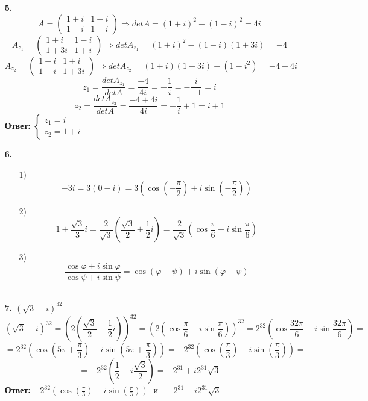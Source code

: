 \documentclass[a4paper]{article}
\newcommand{\mat}[1]{\begin{pmatrix} #1 \end{pmatrix}}
\renewcommand{\f}[2]{\frac{#1}{#2}}
\newcommand{\case}[1]{\begin{cases} #1 \end{cases}}
\renewcommand{\phi}{\varphi}
\renewcommand{\r}{\Rightarrow}
\begin{document}
\begin{enumerate}
    \item[\textbf{5.}]$$A = \mat{1+i & 1-i  \\ 1-i & 1+i} \r det A = (1+i)^2-(1-i)^2 = 4i$$
    $$A_{z_1} = \mat{1 + i & 1-i  \\ 1 + 3i & 1+i} \r detA_{z_1} = (1+i)^2-(1-i)(1+3i) = -4$$
    $$A_{z_2} = \mat{1+i & 1 + i  \\ 1-i & 1 + 3i} \r detA_{z_2} = (1+i)(1+3i)-(1-i^2) = -4 + 4i$$
    $$z_1 = \f{detA_{z_1}}{detA} = \f{-4}{4i}=-\f{1}{i} = -\f{i}{-1} = i$$
    $$z_2 = \f{detA_{z_2}}{detA} = \f{-4+4i}{4i} = -\f{1}{i} + 1 = i+1$$
    \textbf{Ответ: } $\case{z_1 = i \\ z_2 = 1+i}$\\

    \item[\textbf{6.}]
    \begin{enumerate}
        \item[1)]    $$-3i = 3(0-i) = 3(\cos{(-\f{\pi}{2})} + i\sin{(-\f{\pi}{2})})$$
        \item[2)]    $$1+\f{\sqrt{3}}{3}i = \f{2}{\sqrt{3}}(\f{\sqrt{3}}{2} + \f{1}{2}i) = \f{2}{\sqrt{3}}(\cos{\f{\pi}{6}}+i\sin{\f{\pi}{6}})$$
        \item[3)]    $$\f{\cos \phi + i \sin \phi}{\cos \psi + i \sin \psi} = \cos (\phi - \psi) + i \sin (\phi - \psi)$$\\
    \end{enumerate}

    \item[\textbf{7.}]$(\sqrt{3}-i)^{32}$
    $$(\sqrt{3}-i)^{32} = (2(\f{\sqrt{3}}{2}-\f{1}{2}i))^{32} = (2(\cos \f{\pi}{6}-i\sin\f{\pi}{6}))^{32} = 2^{32}(\cos \f{32\pi}{6}-i\sin\f{32\pi}{6}) = $$
    $$=2^{32}(\cos(5\pi + \f{\pi}{3})-i\sin(5\pi + \f{\pi}{3})) = -2^{32}(\cos(\f{\pi}{3})-i\sin(\f{\pi}{3})) = $$
    $$= -2^{32}(\f{1}{2}-i\f{\sqrt{3}}{2}) = -2^{31}+i2^{31}\sqrt{3}$$
    \textbf{Ответ: } $-2^{32}(\cos(\f{\pi}{3})-i\sin(\f{\pi}{3})) \;$ и $ \; -2^{31}+i2^{31}\sqrt{3}$\\


\end{enumerate}
\end{document}

